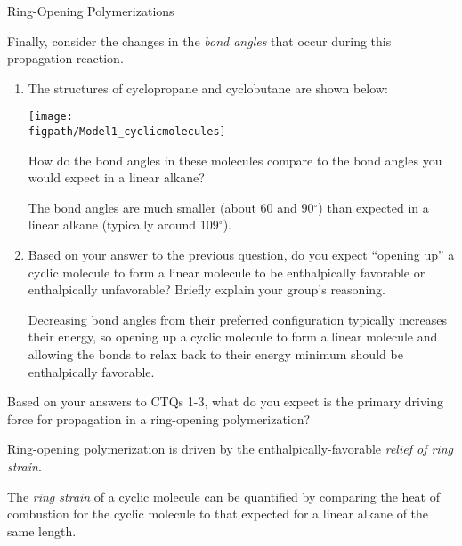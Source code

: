 \begin{activity}{Ring-Opening Polymerizations}
\begin{ctqs}
\begin{enumerate}
		\end{enumerate}
		
	\question Finally, consider the changes in the \emph{bond angles} that occur during this propagation reaction.
	
		\begin{enumerate}
		
			\item The structures of cyclopropane and cyclobutane are shown below:
			
				\centerline{\texttt{[image: \\figpath/Model1\_cyclicmolecules]}}
				
				How do the bond angles in these molecules compare to the bond angles you would expect in a linear alkane?
			
				\begin{solution}[1in]
					The bond angles are much smaller (about 60 and 90$^\circ$) than expected in a linear alkane (typically around 109$^\circ$).
				\end{solution}
				
			\item Based on your answer to the previous question, do you expect ``opening up'' a cyclic molecule to form a linear molecule to be enthalpically favorable or enthalpically unfavorable?  Briefly explain your group's reasoning.
			
				\begin{solution}[1in]
					Decreasing bond angles from their preferred configuration typically increases their energy, so opening up a cyclic molecule to form a linear molecule and allowing the bonds to relax back to their energy minimum should be enthalpically favorable.
				\end{solution}
			
		\end{enumerate}
		
	\question Based on your answers to CTQs 1-3, what do you expect is the primary driving force for propagation in a ring-opening polymerization?
			
				\begin{solution}[0.75in]
					Ring-opening polymerization is driven by the enthalpically-favorable \emph{relief of ring strain}.
				\end{solution}

\end{ctqs}

\begin{infobox}

	The \emph{ring strain} of a cyclic molecule can be quantified by comparing the heat of combustion for the cyclic molecule to that expected for a linear alkane of the same length.
	

\end{infobox}
\end{activity}
